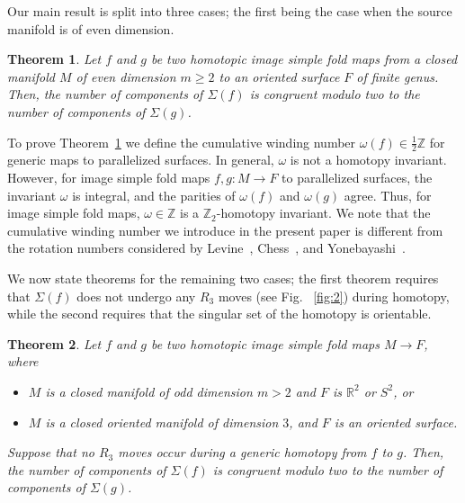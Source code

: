 \documentclass[12pt]{amsart}
\def \R{\mathbb{R}}
\def \Z{\mathbb{Z}}
\def\co{\colon}
\newtheorem{theorem}{Theorem}[section]
\theoremstyle{definition}
\begin{document}
Our main result is split into three cases; the first being the case when the source manifold is of even dimension.
 
 
\begin{theorem} \label{th:1} Let $f$ and $g$ be two homotopic image simple fold maps 
from a closed manifold $M$ of even dimension  $m\geq2$ to an oriented surface $F$ of finite genus.  %
Then,  the number of components of $\Sigma(f)$ is congruent modulo two to the number of components of $\Sigma(g)$. 
 \end{theorem}
 
 
 
 To prove Theorem~\ref{th:1} we define the cumulative winding number $\omega(f)\in \frac{1}{2}\Z$ for generic maps to parallelized surfaces.  In general,  $\omega$ is not a homotopy invariant. However,  for image simple fold maps $f, g\co M\to F$ to parallelized surfaces, the invariant $\omega$ is integral, and the parities of $\omega(f)$ and $\omega(g)$ agree. Thus, for image simple fold maps, $\omega\in \Z$ is a $\Z_2$-homotopy invariant. We note that the cumulative winding number we introduce in the present paper is different from the rotation numbers considered by Levine~\cite{Le66},   Chess~\cite{Chess}, and Yonebayashi~\cite{Yo97}. 
 
 We now state theorems for the remaining two cases; 
 the first theorem requires that $\Sigma(f)$ does not undergo any $R_3$ moves (see Fig. ~\ref{fig:2}) during homotopy, while the second requires that the singular set of the homotopy is orientable. 
 
 \begin{theorem}\label{th:2}  Let $f$ and $g$ be two homotopic image simple fold maps  $M\to F$, where %
\begin{itemize}
\item $M$ is a closed manifold of odd dimension $m> 2$ and $F$ is $\R^2$ or $S^2$, or
\item $M$ is a closed oriented manifold of dimension $3$, and $F$ is an oriented surface.  
 \end{itemize}
Suppose that no $R_3$ moves occur during a generic homotopy from $f$ to $g$. Then, the number of components of $\Sigma(f)$ is congruent modulo two to the number of components of $\Sigma(g)$. 
 \end{theorem}
 
\end{document}
